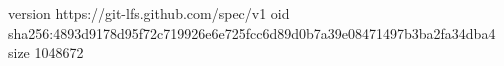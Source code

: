 version https://git-lfs.github.com/spec/v1
oid sha256:4893d9178d95f72c719926e6e725fcc6d89d0b7a39e08471497b3ba2fa34dba4
size 1048672
